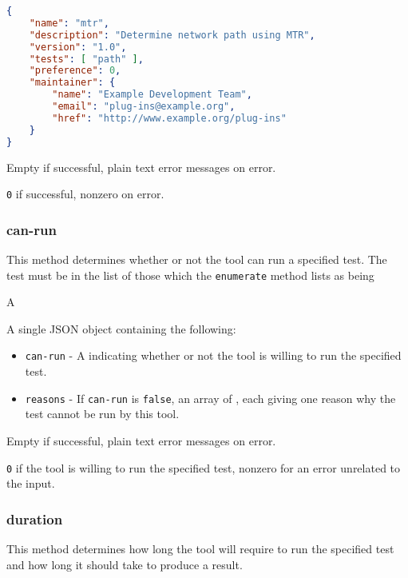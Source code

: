 \documentclass[10pt,titlepage]{article}
\begin{document}
\example
\begin{lstlisting}[language=json,firstnumber=1]
{
    "name": "mtr",
    "description": "Determine network path using MTR",
    "version": "1.0",
    "tests": [ "path" ],
    "preference": 0,
    "maintainer": {
        "name": "Example Development Team",
        "email": "plug-ins@example.org",
        "href": "http://www.example.org/plug-ins"
    }
}
\end{lstlisting}

 Empty if successful, plain text error
messages on error.

 {\tt 0} if successful, nonzero on error.



\subsubsection{can-run}
This method determines whether or not the tool can run a specified
test.  The test must be in the list of those which the {\tt enumerate}
method lists as being

 A 

 A single JSON object containing the
following:

\begin{itemize}
\item{\tt can-run} - A  indicating whether or not
  the tool is willing to run the specified test.
\item{\tt reasons} - If {\tt can-run} is {\tt false}, an array of
  , each giving one reason why the test cannot be run
  by this tool.
\end{itemize}

 Empty if successful, plain text error
messages on error.

 {\tt 0} if the tool is willing to run the
specified test, nonzero for an error unrelated to the input.



\subsubsection{duration}

This method determines how long the tool will require to run the
specified test and how long it should take to produce a result.
\end{document}
